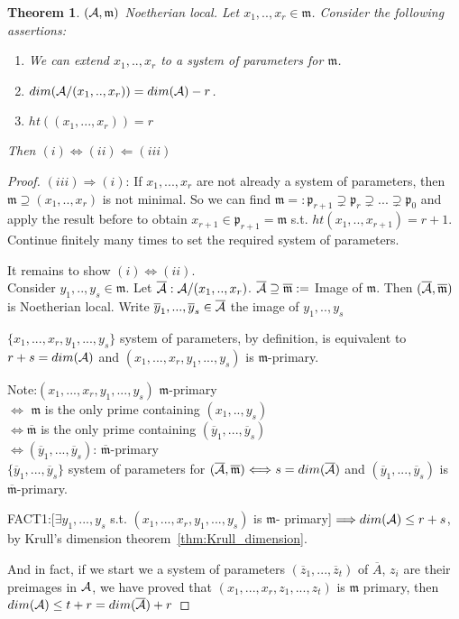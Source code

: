 \documentclass[11pt]{article}
\newtheorem{thm}{Theorem}[section]
\newcommand{\scm}{{\mathfrak m}}
\newcommand{\scp}{{\mathfrak p}}
\newcommand{\cala}{{\cal A}}
\newcommand{\Lrta}{\Longrightarrow}
\newcommand{\Llta}{\Longleftarrow}
\newcommand{\Llrta}{\Longleftrightarrow}
\begin{document}
\begin{thm}
$(\cala,\scm)$ Noetherian local. Let $x_1,..,x_r\in\scm$. Consider the following assertions:
\begin{enumerate}[label=(\roman*)]
\item We can extend $x_1,..,x_r$ to a system of parameters for $\scm$.
\item $dim(\cala/(x_1,..,x_r))=dim(\cala)-r$.
\item $ht((x_1,...,x_r))=r$
\end{enumerate}
Then $(i)\Llrta(ii)\Llta(iii)$
\end{thm}
\begin{proof}
$(iii)\Lrta(i)$: If $x_1,...,x_r$ are not already a system of parameters, then $\scm\supseteq(x_1,..,x_r)$ is not minimal. So we can find $\scm=:\scp_{r+1}\supsetneq \scp_r\supsetneq ...\supsetneq \scp_0$ and apply the result before to obtain $x_{r+1}\in\scp_{r+1}=\scm$ s.t. $ht(x_1,..,x_{r+1})=r+1$. Continue finitely many times to set the required system of parameters.

It remains to show $(i)\Llrta (ii)$. \\
Consider $y_1,..,y_s\in\scm$. Let $\overline{\cala}:\cala/(x_1,..,x_r)$. $\overline{\cala}\supseteq\overline{\scm}:=$ Image  of $\scm$. Then $(\overline{\cala},\overline{\scm})$ is Noetherian local. Write $\overline{y}_1,...,\overline{y}_s\in\overline{\cala}$ the image of $y_1,..,y_s$

$\{x_1,...,x_r,y_1,...,y_s\}$ system of parameters, by definition, is equivalent to $r+s=dim(\cala)$ and $(x_1,...,x_r,y_1,...,y_s)$ is $\scm$-primary.

Note:$(x_1,...,x_r,y_1,...,y_s)$ $\scm$-primary\\
$\Llrta$ $\scm$ is the only prime containing $(x_1,..,y_s)$\\
$\Llrta\overline{\scm}$ is the only prime containing $(\overline{y}_1,...,\overline{y}_s)$\\
$\Llrta(\overline{y}_1,...,\overline{y}_s)$: $\overline{\scm}$-primary\\
$\{\overline{y}_1,...,\overline{y}_s\}$ system of parameters for $(\overline{\cala},\overline{\scm})\Llrta s=dim(\overline{\cala})$ and $(\overline{y}_1,...,\overline{y}_s)$ is $\overline{\scm}$-primary.

FACT1:[$\exists y_1,...,y_s$ s.t. $(x_1,...,x_r,y_1,...,y_s)$ is $\scm$- primary] $\Lrta dim(\cala)\leq r+s$, by Krull's dimension theorem~\ref{thm:Krull_dimension}.

And in fact, if we start we a system of parameters $(\overline{z}_1,...,\overline{z}_t)$ of $\overline{A}$, $z_i$ are their preimages in $\cala$, we have proved that $(x_1,...,x_r,z_1,...,z_t)$ is $\scm$ primary, then $dim(\cala)\leq t+r= dim(\overline{\cala})+r$


\end{proof}
\end{document}
